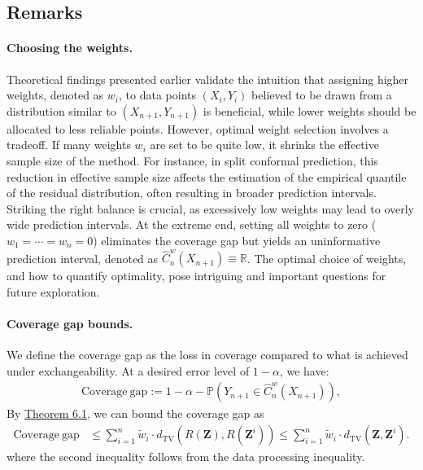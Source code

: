 \documentclass{article}
\numberwithin{equation}{section}
\begin{document}
\subsection{Remarks}
\paragraph{Choosing the weights.} Theoretical findings presented earlier validate the intuition that assigning higher weights, denoted as $w_i$, to data points $(X_i, Y_i)$ believed to be drawn from a distribution similar to $(X_{n+1}, Y_{n+1})$ is beneficial, while lower weights should be allocated to less reliable points. However, optimal weight selection involves a tradeoff. If many weights $w_i$ are set to be quite low, it shrinks the effective sample size of the method. For instance, in split conformal prediction, this reduction in effective sample size affects the estimation of the empirical quantile of the residual distribution, often resulting in broader prediction intervals. Striking the right balance is crucial, as excessively low weights may lead to overly wide prediction intervals. At the extreme end, setting all weights to zero ($w_1 = \cdots = w_n = 0$) eliminates the coverage gap but yields an uninformative prediction interval, denoted as $\widehat{C}_n^w(X_{n+1})\equiv \mathbb{R}$. The optimal choice of weights, and how to quantify optimality, pose intriguing and important questions for future exploration.

\paragraph{Coverage gap bounds.} We define the coverage gap as the loss in coverage compared to what is achieved under exchangeability. At a desired error level of $1-\alpha$, we have:
\begin{align*}
	\mathrm{Coverage\ gap} := 1-\alpha - \mathbb{P}\left(Y_{n+1}\in\widehat{C}_n^w(X_{n+1})\right),\tag{6.26}
\end{align*}
By \hyperref[Theorem 6.1]{Theorem 6.1}, we can bound the coverage gap as
\begin{align*}
	\mathrm{Coverage\ gap} &\leq \sum_{i=1}^n\widetilde{w}_i\cdot d_\mathrm{TV}\left(R(\mathbf{Z}),R(\mathbf{Z}^i)\right) \leq \sum_{i=1}^n\widetilde{w}_i\cdot d_\mathrm{TV}\left(\mathbf{Z},\mathbf{Z}^i\right).\tag{6.27}\label{6.27}
\end{align*}
where the second inequality follows from the data processing inequality.
\end{document}

